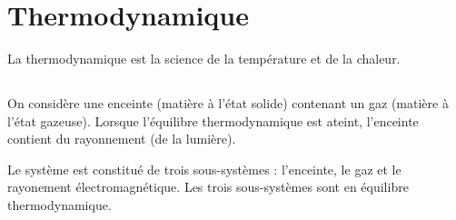 \section{Thermodynamique}
La thermodynamique est la science de la température et de la chaleur.

\subsection{}

On considère une enceinte (matière à l'état solide) contenant un gaz (matière à l'état gazeuse). Lorsque l'équilibre thermodynamique est ateint, l'enceinte contient du rayonnement (de la lumière).

Le système est constitué de trois sous-systèmes : l'enceinte, le gaz et le rayonement électromagnétique. Les trois sous-systèmes sont en équilibre thermodynamique.
\subsection{}

\subsection{}
\begin{center}
\end{center}

